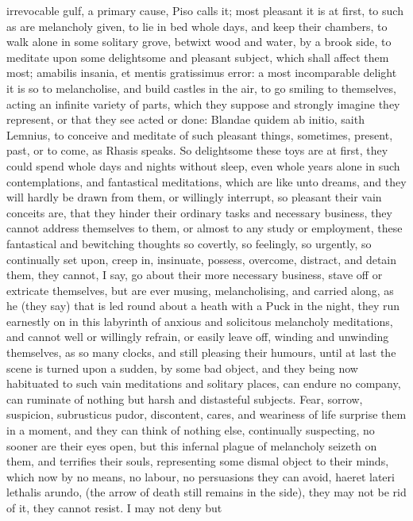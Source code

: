 {irrevocable gulf, a primary cause, Piso calls it; most pleasant
it is at first, to such as are melancholy given, to lie in bed whole
days, and keep their chambers, to walk alone in some solitary grove,
betwixt wood and water, by a brook side, to meditate upon some
delightsome and pleasant subject, which shall affect them most;
amabilis insania, et mentis gratissimus error: a most incomparable
delight it is so to melancholise, and build castles in the air, to go
smiling to themselves, acting an infinite variety of parts, which they
suppose and strongly imagine they represent, or that they see acted or
done: Blandae quidem ab initio, saith Lemnius, to conceive and meditate
of such pleasant things, sometimes, present, past, or to come, as
Rhasis speaks. So delightsome these toys are at first, they could spend
whole days and nights without sleep, even whole years alone in such
contemplations, and fantastical meditations, which are like unto
dreams, and they will hardly be drawn from them, or willingly
interrupt, so pleasant their vain conceits are, that they hinder their
ordinary tasks and necessary business, they cannot address themselves
to them, or almost to any study or employment, these fantastical and
bewitching thoughts so covertly, so feelingly, so urgently, so
continually set upon, creep in, insinuate, possess, overcome, distract,
and detain them, they cannot, I say, go about their more necessary
business, stave off or extricate themselves, but are ever musing,
melancholising, and carried along, as he (they say) that is led round
about a heath with a Puck in the night, they run earnestly on in this
labyrinth of anxious and solicitous melancholy meditations, and cannot
well or willingly refrain, or easily leave off, winding and unwinding
themselves, as so many clocks, and still pleasing their humours, until
at last the scene is turned upon a sudden, by some bad object, and they
being now habituated to such vain meditations and solitary places, can
endure no company, can ruminate of nothing but harsh and distasteful
subjects. Fear, sorrow, suspicion, subrusticus pudor, discontent,
cares, and weariness of life surprise them in a moment, and they can
think of nothing else, continually suspecting, no sooner are their eyes
open, but this infernal plague of melancholy seizeth on them, and
terrifies their souls, representing some dismal object to their minds,
which now by no means, no labour, no persuasions they can avoid, haeret
lateri lethalis arundo, (the arrow of death still remains in the side),
they may not be rid of it, they cannot resist. I may not deny but
}
